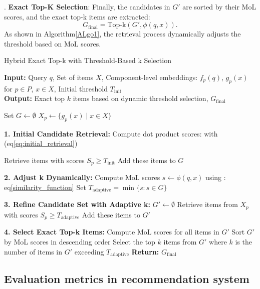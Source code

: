 \documentclass[Afour,sageh,times]{sagej}
\begin{document}
. \textbf{Exact Top-K Selection}:  
Finally, the candidates in \(G'\) are sorted by their MoL scores, and the exact top-k items are extracted:
\begin{equation}
G_{\text{final}} = \text{Top-k}(G', \phi(q, x)).
\end{equation}
As shown in Algorithm\ref{ALgo1}, the retrieval process dynamically adjusts the threshold based on MoL scores.
\begin{algorithm}
	\caption{Hybrid Exact Top-k with Threshold-Based k Selection}
	\label{ALgo1}
	\textbf{Input:} Query $q$, Set of items $X$, Component-level embeddings: $f_p(q)$, $g_p(x)$ for $p \in P$, $x \in X$, Initial threshold $T_{\text{init}}$ \\
	\textbf{Output:} Exact top $k$ items based on dynamic threshold   selection, $G_{\text{final}}$
	
	\begin{algorithmic}[1]
		\State Set $G \gets \emptyset$     
		\State $X_p \gets \{g_p(x) \mid x \in X\}$ 
		\EndFor
		
		\textbf{1. Initial Candidate Retrieval:}
		\State Compute dot product scores:  with (eq\eqref{eq:initial_retrieval})
		
		\State Retrieve items with scores $S_p \geq T_{\text{init}}$
		\State Add these items to $G$
		\EndFor
		
		\textbf{2. Adjust k Dynamically:}
		\State Compute MoL scores $s \gets \phi(q, x)$ using : eq\eqref{similarity_function}
		\State Set $T_{\text{adaptive}} = \min \{s : s \in G\}$
		\EndFor
		
		\textbf{3. Refine Candidate Set with Adaptive k:}
		\State	$G' \gets \emptyset$
		\State Retrieve items from $X_p$ with scores $S_p \geq T_{\text{adaptive}}$
		\State Add these items to $G'$
		\EndFor
		
		\textbf{4. Select Exact Top-k Items:}
		\State Compute MoL scores for all items in $G'$
		\State Sort $G'$ by MoL scores in descending order
		\State Select the top $k$ items from $G'$ where $k$ is the number of items in $G'$ exceeding $T_{\text{adaptive}}$
		\EndFor
		\State\textbf{ Return:} $G_{\text{final}}$ 
	\end{algorithmic}
\end{algorithm}
\subsection{Evaluation metrics in recommendation system}
\end{document}
